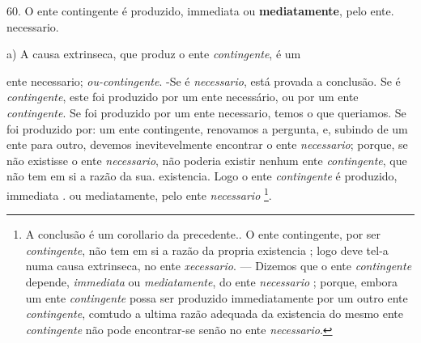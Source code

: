 \textbar{} 60. O ente contingente é produzido, immediata ou \textbf{mediatamente}, pelo ente. necessario.

a) A causa extrinseca, que produz o ente \emph{contingente}, é um

ente necessario; \emph{ou-contingente}. -Se é \emph{necessario}, está provada a conclusão. Se é \emph{contingente}, este foi produzido por um ente necessário, ou por um ente \emph{contingente}. Se foi produzido por um ente necessario, temos o que queriamos. Se foi produzido por: um ente contingente, renovamos a pergunta, e, subindo de um ente para outro, devemos inevitevelmente encontrar o ente \emph{necessario}; porque, se não existisse o ente \emph{necessario}, não poderia existir nenhum ente \emph{contingente}, que não tem em si a razão da sua. existencia. Logo o ente \emph{contingente} é produzido, immediata . ou mediatamente, pelo ente \emph{necessario} \footnote{A conclusão é um corollario da precedente.. O ente contingente, por ser \emph{contingente}, não tem em si a razão da propria existencia ; logo deve tel-a numa causa extrinseca, no ente \emph{xecessario}. --- Dizemos que o ente \emph{contingente} depende, \emph{immediata} ou \emph{mediatamente}, do ente \emph{necessario} ; porque, embora um ente \emph{contingente} possa ser produzido immediatamente por um outro ente \emph{contingente}, comtudo a ultima razão adequada da existencia do mesmo ente \emph{contingente} não pode encontrar-se senão no ente \emph{necessario}.}.

